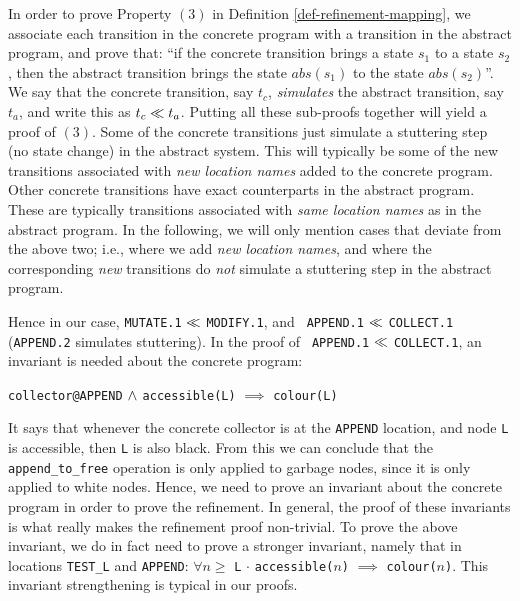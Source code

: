In  order      to     prove   Property    $(3)$      in     Definition
\ref{def-refinement-mapping}, we   associate  each transition  in  the
concrete program with a transition  in the abstract program, and prove
that: ``if the  concrete transition brings   a state $s_1$ to  a state
$s_2$, then the abstract transition brings the state $abs(s_1)$ to the
state $abs(s_2)$''.   We say that  the concrete transition, say $t_c$,
{\em simulates} the abstract transition, say $t_a$,  and write this as
$t_c \ll t_a$.  Putting  all these sub-proofs together will yield
a proof of $(3)$.   Some of the  concrete transitions just simulate  a
stuttering step  (no state change) in the  abstract system.  This will
typically be   some of the  new  transitions associated with  {\em new
  location  names}  added  to  the  concrete program.  
Other   concrete transitions have   exact counterparts in the abstract
program.   These are typically transitions  associated  with {\em same
  location names}  as  in the abstract program.  In the
following, we will only mention cases that deviate from the above two;
i.e.,  where  we   add  {\em  new   location   names},  and  where  the
corresponding {\em new} transitions do {\em not} simulate a stuttering
step in the abstract program.

Hence in our case, {\tt MUTATE.1} $\ll$  {\tt MODIFY.1}, and {\tt
  APPEND.1}  $\ll$ {\tt  COLLECT.1}\label{append-refines-collect}
({\tt APPEND.2} simulates   stuttering)\@.    In the proof  of    {\tt
  APPEND.1} $\ll$ {\tt COLLECT.1},  an invariant is needed  about
the concrete program:

\begin{center}
\label{refinement1-inv1}
  {\tt collector@APPEND} $\wedge$ {\tt accessible(L)} 
  $\implies$ {\tt colour(L)}
\end{center}

\noindent
It says that whenever  the concrete collector is  at the {\tt  APPEND}
location, and node {\tt L} is accessible, then  {\tt L} is also black. 
From this we can conclude that the {\tt append\_to\_free} operation is
only applied to garbage nodes, since it is only applied to white nodes.
Hence, we need  to prove an  invariant about  the concrete program  in
order  to  prove  the refinement.  In   general,  the  proof of  these
invariants is what really makes the refinement  proof non-trivial.  To
prove the above invariant, we   do in fact  need  to prove a  stronger
invariant, namely that in locations  {\tt TEST\_L} and {\tt  APPEND}:
$\forall n \ge$ {\tt L} $\cdot$  
{\tt accessible(}$n${\tt )} $\implies$ {\tt colour(}$n${\tt )}. 
This invariant strengthening is typical in our proofs.


